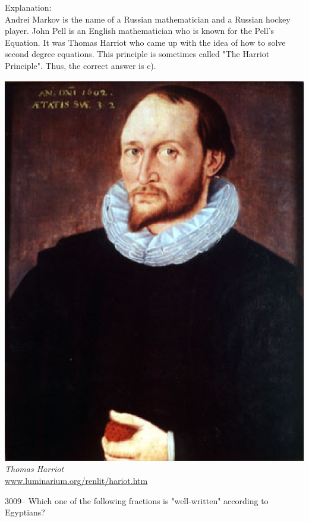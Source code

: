 \documentclass[letterpaper, 12pt]{article}
\begin{document}
Explanation:\\
Andrei Markov is the name of a Russian mathematician and a Russian hockey player. John Pell is an English mathematician who is known for the Pell's Equation. It was Thomas Harriot who came up with the idea of how to solve second degree equations. This principle is sometimes called "The Harriot Principle". Thus, the correct answer is c).\\
\begin{center}
\includegraphics[scale=0.25]{harriot.eps}\\
\emph{{\small Thomas Harriot}}\\
\href{http://www.luminarium.org/renlit/hariot.htm}{www.luminarium.org/renlit/hariot.htm}\\[5mm]
\end{center}



3009-- Which one of the following fractions is "well-written" according to Egyptians?\\
\end{document}
